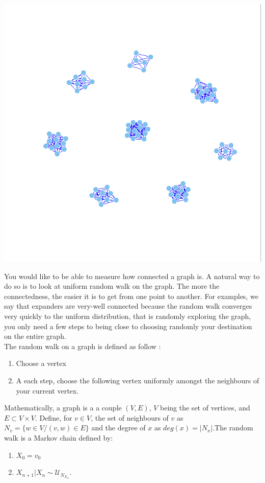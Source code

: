\documentclass[a0,portrait]{a0poster}
\begin{document}
\begin{multicols}{2}
\begin{center}\vspace{1cm}
\includegraphics[width=0.9\linewidth]{Graphs5}
\end{center}\vspace{1cm}

You would like to be able to measure how connected a graph is. A natural way to do so is to look at uniform random walk on the graph. The more the connectedness, the easier it is to get from one point to another. For examples, we say that expanders are very-well connected because the random walk converges very quickly to the uniform distribution, that is randomly exploring the graph, you only need a few steps to being close to choosing randomly your destination on the entire graph.\\

The random walk on a graph is defined as follow :\\
\begin{enumerate}
\item Choose a vertex
\item A each step, choose the following vertex uniformly amongst the neighbours of your current vertex.\\
\end{enumerate}

Mathematically, a graph is a a couple $(V,E)$, $V$ being the set of vertices, and $E\subset V\times V$. Define, for $v\in V$, the set of neighbours of $v$ as $N_v=\{w\in V / (v,w)\in E\}$ and the degree of $x$ as $deg(x)=|N_x|$.The random walk is a Markov chain defined by:\\
\begin{enumerate}
\item $X_0=v_0$
\item $X_{n+1}|X_n\sim \mathcal U_{N_{X_n}}$. \\
\end{enumerate}


\end{multicols}
\end{document}
